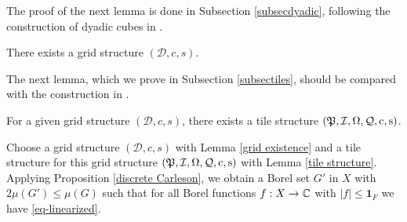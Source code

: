 The proof of the next lemma is done in Subsection \ref{subsecdyadic},
following the construction of dyadic cubes in \cite[\S 3]{christ1990b}.

\begin{lemma}\label{grid existence}

    There exists a grid structure $(\mathcal{D}, c,s)$.
\end{lemma}




The next lemma, which we prove in Subsection \ref{subsectiles}, should be compared
with the construction in \cite[Lemma 2.12]{zk-polynomial}.

\begin{lemma}\label{tile structure}
    For a given grid structure $(\mathcal{D}, c,s)$, there exists a tile structure
    $(\mathfrak P,\mathcal{I},\Omega,\mathcal{Q},\mathrm{c},\mathrm{s})$.
\end{lemma}

Choose a grid structure $(\mathcal{D}, c,s)$ with Lemma \ref{grid existence} and a tile structure for this
grid structure $(\mathfrak P,\mathcal{I},\Omega,\mathcal{Q},\mathrm{c},\mathrm{s})$ with Lemma \ref{tile structure}.
Applying Proposition \ref{discrete Carleson}, we obtain a Borel set $G'$ in $X$ with $2\mu(G')\leq \mu(G)$ such that for all Borel functions $f:X\to \mathbb{C}$ with $|f|\le \mathbf{1}_F$
we have \eqref{eq-linearized}.

